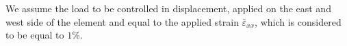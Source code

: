 \documentclass[a4paper]{jpconf}
\begin{document}
We assume the load to be controlled in displacement, applied on the east and west side of the element and equal to the applied strain $\bar{\varepsilon}_{xx}$, which is considered to be equal to $1\%$.
\begin{figure}[H]
\centering
   \\

\end{figure}
\end{document}
